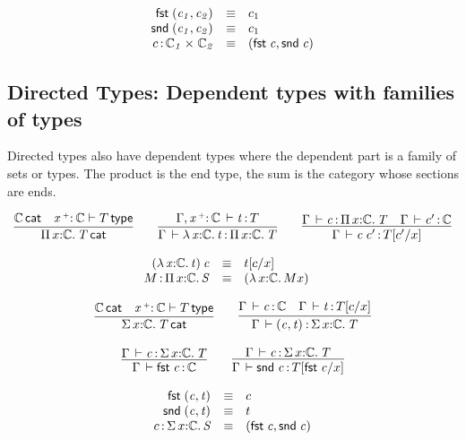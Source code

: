 \documentclass[11pt]{article}
\theoremstyle{plain}
\begin{document}
\[
\begin{array}{rcll}
\mathit{\mathsf{fst}_{} \: \mathit{(c_1,c_2)_{}}} & \equiv & c_1 \\
\mathit{\mathsf{snd}_{} \: \mathit{(c_1,c_2)_{}}} & \equiv & c_1 \\
c \, \mathit{:} \, \mathit{\mathbb{C}_1} \times_{\mathit{}} \mathit{\mathbb{C}_2} & \equiv & \mathit{(\mathit{\mathsf{fst}_{} \: c},\mathit{\mathsf{snd}_{} \: c})_{}}
\end{array}
\]

\subsection{Directed Types: Dependent types with families of types}

Directed types also have dependent types where the dependent part is a
family of sets or types. The product is the end type, the sum is the category whose sections are ends.  

\[
\begin{array}{c}
\infer{\wfdtp{\picl{x}{\C}{T}}}
      {\wfdtp{\C} &
       \wftp{\vptptm{x}{\co}{\C}}{T}}
\qquad
\infer{\ofdtp{\Gamma}{\lam{x}{\C}{t}}{\picl x \C T}}
      {\oftp{\Gamma,\vtptm{x}{\co}{\C}}{t}{T}}
\qquad
\infer{\oftp{\Gamma}{\app c {c'}}{\subst T {c'} x}}
      {\oftp{\Gamma}{c}{\picl{x}{\C}{T}} &
        \oftp{\Gamma}{c'}{\C}}
\end{array}
\]

\[
\begin{array}{rcll}
\mathit{({\lambda\,x \mathit{:} \mathbb{C}.\,t}) \: c} & \equiv & t [ c / x ] \\
M \, \mathit{:} \, \textnormal{$\Pi$}\,x \mathit{:} \mathbb{C}.\,\mathit{S} & \equiv & {({\lambda\,x \mathit{:} \mathbb{C}.\,M}{x})} &
\end{array} \\
\]

\[
\begin{array}{c}
\infer{\wfdtp{\sigmacl{x}{\C}{T}}}
      {\wfdtp{\C} &
        \wftp{\vtptm{x}{\co}{\C}}{T}}
\qquad
\infer{\ofdtp{\Gamma}{\pair{c}{t}}{\sigmacl x \C T}}
      {\ofdtp{\Gamma}{c}{\C} &
       \ofdtp{\Gamma}{t}{\subst{T}{c}{x}}}
\\ \\
\infer{\ofdtp{\Gamma}{\fst c}{\C}}
      {\ofdtp{\Gamma}{c}{\sigmacl{x}{\C}{T}}}
\qquad
\infer{\ofdtp{\Gamma}{\snd c}{\subst{T}{\fst c}{x}}}
      {\ofdtp{\Gamma}{c}{\sigmacl{x}{\C}{T}}}
\end{array}
\]

\[
\begin{array}{rcll}
\mathit{\mathsf{fst}_{} \: \mathit{(c,t)_{}}} & \equiv & c \\
\mathit{\mathsf{snd}_{} \: \mathit{(c,t)_{}}} & \equiv & t \\
c \, \mathit{:} \, \textnormal{$\Sigma$}\,x \mathit{:} \mathbb{C}.\,\mathit{S} & \equiv & \mathit{(\mathit{\mathsf{fst}_{} \: c},\mathit{\mathsf{snd}_{} \: c})_{}}
\end{array}
\]
\end{document}
